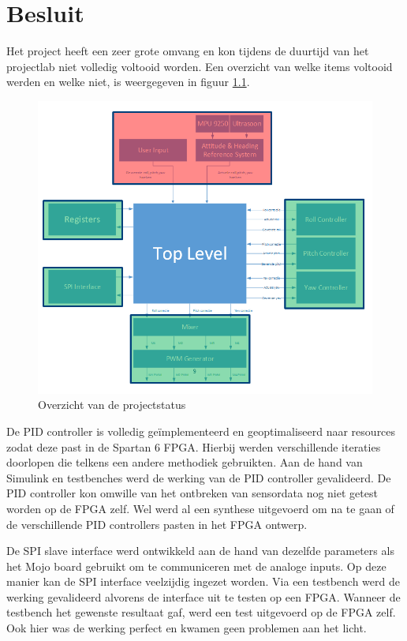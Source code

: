 \chapter{Besluit}
\label{besluit}

	\par Het project heeft een zeer grote omvang en kon tijdens de duurtijd van het projectlab niet volledig voltooid worden. Een overzicht van welke items voltooid werden en welke niet, is weergegeven in figuur \ref{quad_ready}.

	\begin{figure}[H]					  
		  \centering
		  \includegraphics[width=\textwidth]{Besluit/quad_ready.png}
		  \caption{Overzicht van de projectstatus}
		  \label{quad_ready}
	\end{figure}

	\par De PID controller is volledig ge\"implementeerd  en geoptimaliseerd naar resources zodat deze past in de Spartan 6 FPGA. Hierbij werden verschillende iteraties doorlopen die telkens een andere methodiek gebruikten. Aan de hand van Simulink en testbenches werd de werking van de PID controller gevalideerd. De PID controller kon omwille van het ontbreken van sensordata nog niet getest worden op de FPGA zelf. Wel werd al een synthese uitgevoerd om na te gaan of de verschillende PID controllers pasten in het FPGA ontwerp. 

	\par De SPI slave interface werd ontwikkeld aan de hand van dezelfde parameters als het Mojo board gebruikt om te communiceren met de analoge inputs. Op deze manier kan de SPI interface veelzijdig ingezet worden. Via een testbench werd de werking gevalideerd alvorens de interface uit te testen op een FPGA. Wanneer de testbench het gewenste resultaat gaf, werd een test uitgevoerd op de FPGA zelf. Ook hier was de werking perfect en kwamen geen problemen aan het licht.

